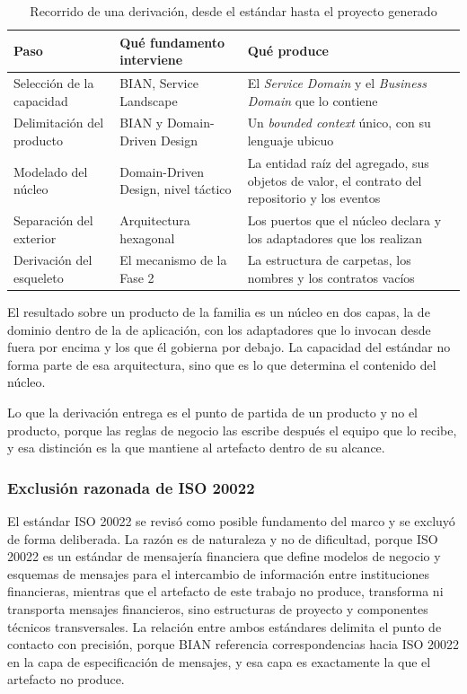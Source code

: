 \begin{table}[H]
\centering
{\footnotesize
\begin{tabular}{p{3.6cm}p{4.6cm}p{6.5cm}}
\toprule
\textbf{Paso} & \textbf{Qué fundamento interviene} & \textbf{Qué produce} \\
\midrule
Selección de la capacidad & BIAN, Service Landscape & El \emph{Service Domain} y el \emph{Business Domain} que lo contiene \\
Delimitación del producto & BIAN y Domain-Driven Design & Un \emph{bounded context} único, con su lenguaje ubicuo \\
Modelado del núcleo & Domain-Driven Design, nivel táctico & La entidad raíz del agregado, sus objetos de valor, el contrato del repositorio y los eventos \\
Separación del exterior & Arquitectura hexagonal & Los puertos que el núcleo declara y los adaptadores que los realizan \\
Derivación del esqueleto & El mecanismo de la Fase 2 & La estructura de carpetas, los nombres y los contratos vacíos \\
\bottomrule
\end{tabular}
}
\caption{Recorrido de una derivación, desde el estándar hasta el proyecto generado}
\label{tab:derivacion}
\end{table}

El resultado sobre un producto de la familia es un núcleo en dos capas, la de
dominio dentro de la de aplicación, con los adaptadores que lo invocan desde
fuera por encima y los que él gobierna por debajo. La capacidad del estándar
no forma parte de esa arquitectura, sino que es lo que determina el contenido
del núcleo.

Lo que la derivación entrega es el punto de partida de un producto y no el
producto, porque las reglas de negocio las escribe después el equipo que lo
recibe, y esa distinción es la que mantiene al artefacto dentro de su
alcance.

\subsubsection*{Exclusión razonada de ISO 20022}

El estándar ISO 20022 se revisó como posible fundamento del marco y se
excluyó de forma deliberada. La razón es de naturaleza y no de dificultad, porque
ISO 20022 es un estándar de mensajería financiera que define modelos de
negocio y esquemas de mensajes para el intercambio de información entre
instituciones financieras, mientras que el artefacto de este trabajo no
produce, transforma ni transporta mensajes financieros, sino estructuras de
proyecto y componentes técnicos transversales. La relación entre ambos
estándares delimita el punto de contacto con precisión, porque BIAN
referencia correspondencias hacia ISO 20022 en la capa de especificación de
mensajes, y esa capa es exactamente la que el artefacto no produce.

